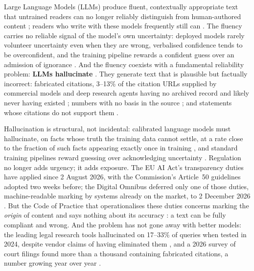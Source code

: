 \documentclass[11pt,a4paper]{article}
\begin{document}
Large Language Models (LLMs) produce fluent, contextually appropriate text that untrained readers can no longer reliably distinguish from human-authored content \citep{clark2021,jakesch2023,jones2026}; readers who write with these models frequently still can \citep{russell2025}. The fluency carries no reliable signal of the model's own uncertainty: deployed models rarely volunteer uncertainty even when they are wrong, verbalised confidence tends to be overconfident, and the training pipeline rewards a confident guess over an admission of ignorance \citep{zhou2024,xiong2024,kalai2025}. And the fluency coexists with a fundamental reliability problem: \textbf{LLMs hallucinate} \citep{ji2023}. They generate text that is plausible but factually incorrect: fabricated citations, 3--13\% of the citation URLs supplied by commercial models and deep research agents having no archived record and likely never having existed \citep{rao2026}; numbers with no basis in the source \citep{cao2024}; and statements whose citations do not support them \citep{liu2023verifiability}.

Hallucination is structural, not incidental: calibrated language models must hallucinate, on facts whose truth the training data cannot settle, at a rate close to the fraction of such facts appearing exactly once in training \citep{kalai2024}, and standard training pipelines reward guessing over acknowledging uncertainty \citep{kalai2025}. Regulation no longer adds urgency; it adds exposure. The EU AI Act's transparency duties have applied since 2 August 2026, with the Commission's Article~50 guidelines adopted two weeks before; the Digital Omnibus deferred only one of those duties, machine-readable marking by systems already on the market, to 2 December 2026 \citep{euaiact,art50guidelines2026,omnibus2026}. But the Code of Practice that operationalises these duties concerns marking the \textit{origin} of content and says nothing about its accuracy \citep{transparencycode2026}: a text can be fully compliant and wrong. And the problem has not gone away with better models: the leading legal research tools hallucinated on 17--33\% of queries when tested in 2024, despite vendor claims of having eliminated them \citep{magesh2025}, and a 2026 survey of court filings found more than a thousand containing fabricated citations, a number growing year over year \citep{liu2026citations}.
\end{document}

